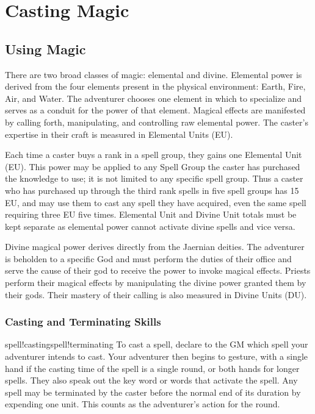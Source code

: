 \chapter{Casting Magic}
\label{ch:casting-magic}
\section{Using Magic}
There are two broad classes of magic: elemental and divine. Elemental power is derived from the four elements present in the physical environment: Earth, Fire, Air, and Water. The adventurer chooses one element in which to specialize and serves as a conduit for the power of that element. Magical effects are manifested by calling forth, manipulating, and controlling raw elemental power. The caster's expertise in their craft is measured in Elemental Units (EU).

Each time a caster buys a rank in a spell group, they gains one Elemental Unit (EU). This power may be applied to any Spell Group the caster has purchased the knowledge to use; it is not limited to any specific spell group. Thus a caster who has purchased up through the third rank spells in five spell groups has 15 EU, and may use them to cast any spell they have acquired, even the same spell requiring three EU five times. Elemental Unit and Divine Unit totals must be kept separate as elemental power cannot activate divine spells and vice versa.

Divine magical power derives directly from the Jaernian deities. The adventurer is beholden to a specific God and must perform the duties of their office and serve the cause of their god to receive the power to invoke magical effects. Priests perform their magical effects by manipulating the divine power granted them by their gods. Their mastery of their calling is also measured in Divine Units (DU).
\subsection{Casting and Terminating Skills}
spell!castingspell!terminating
To cast a spell, declare to the GM which spell your adventurer intends to cast. Your adventurer then begins to gesture, with a single hand if the casting time of the spell is a single round, or both hands for longer spells. They also speak out the key word or words that activate the spell. Any spell may be terminated by the caster before
the normal end of its duration by expending one unit. This counts as the adventurer's action for the round.
